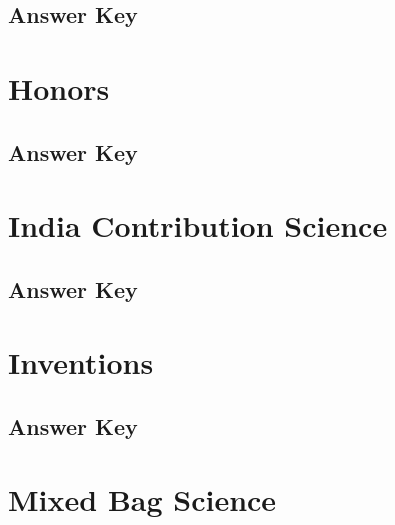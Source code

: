 \documentclass[12pt,a4paper]{book}
\newcounter{totalcounter}
\begin{document}


\subsection*{Answer Key}



\setcounter{totalcounter}{1}

\section{Honors}



\subsection*{Answer Key}



\setcounter{totalcounter}{1}

\section{India Contribution Science}



\subsection*{Answer Key}



\setcounter{totalcounter}{1}

\section{Inventions}



\subsection*{Answer Key}



\setcounter{totalcounter}{1}

\section{Mixed Bag Science}
\end{document}
